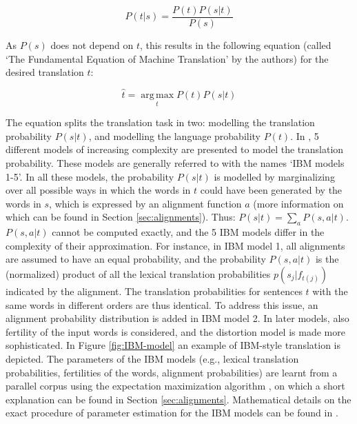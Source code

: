 \documentclass{report}
\theoremstyle{definition}
\theoremstyle{plain}
\begin{document}
\[
P(t|s) = \frac{P(t)P(s|t)}{P(s)}
\]

As $P(s)$ does not depend on $t$, this results in the following equation (called `The Fundamental Equation of Machine Translation' by the authors) for the desired translation $\hat{t}$:

\[
\hat{t} = \operatorname*{arg\,max}_t P(t)P(s|t)
\]

The equation splits the translation task in two: modelling the translation probability $P(s|t)$, and modelling the language probability $P(t)$. In \cite{brown1993mathematics}, 5 different models of increasing complexity are presented to model the translation probability. These models are generally referred to with the names `IBM models 1-5'. In all these models, the probability $P(s|t)$ is modelled by marginalizing over all possible ways in which the words in $t$ could have been generated by the words in $s$, which is expressed by an alignment function $a$ (more information on which can be found in Section \ref{sec:alignments}). Thus: $P(s|t) = \sum_a P(s,a|t)$. $P(s,a|t)$ cannot be computed exactly, and the 5 IBM models differ in the complexity of their approximation. For instance, in IBM model 1, all alignments are assumed to have an equal probability, and the probability $P(s,a|t)$ is the (normalized) product of all the lexical translation probabilities $p(s_j|f_{t(j)})$ indicated by the alignment. The translation probabilities for sentences $t$ with the same words in different orders are thus identical. To address this issue, an alignment probability distribution is added in IBM model 2. In later models, also fertility of the input words is considered, and the distortion model is made more sophisticated. In Figure \ref{fig:IBM-model} an example of IBM-style translation is depicted. The parameters of the IBM models (e.g., lexical translation probabilities, fertilities of the words, alignment probabilities) are learnt from a parallel corpus using the expectation maximization algorithm \citep{dempster1977maximum}, on which a short explanation can be found in Section \ref{sec:alignments}. Mathematical details on the exact procedure of parameter estimation for the IBM models can be found in \cite{brown1993mathematics}.
\end{document}
